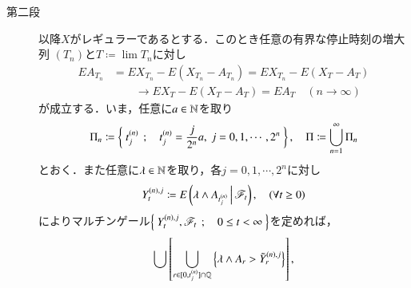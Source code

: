\begin{prf}
\begin{description}
			\item[第二段]
				以降$X$がレギュラーであるとする．このとき任意の有界な停止時刻の増大列
				$(T_n)$と$T \coloneqq \lim T_n$に対し
				\begin{align}
					EA_{T_n} &= EX_{T_n} - E(X_{T_n} - A_{T_n})
					= EX_{T_n} - E(X_T - A_T) \\
					&\qquad \longrightarrow EX_T - E(X_T - A_T)
					= EA_T
					\quad (n \longrightarrow \infty)
					\label{eq:chapter_1_theorem_4_14_1}
				\end{align}
				が成立する．いま，任意に$a \in \mathbb{N}$を取り
				\begin{align}
					\Pi_n \coloneqq 
					\Set{t^{(n)}_j}{t^{(n)}_j = \frac{j}{2^n}a,\ j=0,1,\cdots,2^n},
					\quad \Pi \coloneqq \bigcup_{n=1}^\infty \Pi_n
				\end{align}
				とおく．また任意に$\lambda \in \mathbb{N}$を取り，各$j = 0,1,\cdots,2^n$に対し
				\begin{align}
					Y^{(n),j}_t \coloneqq
					E\left( \lambda \wedge A_{t^{(n)}_j} \, \middle|\, \mathscr{F}_t \right),
					\quad (\forall t \geq 0)
				\end{align}
				によりマルチンゲール$\left\{\ Y^{(n),j}_t,\mathscr{F}_t\ \, ; \quad 0 \leq t < \infty\ \right\}$を定めれば，
				\begin{align}
					[0,\infty) \ni t \longmapsto EY^{(n),j}_t 
					= E\left(\lambda \wedge A_{t^{(n)}_j}\right)
				\end{align}
				と Theorem 3.13 より$RCLL$な修正$\tilde{Y}^{(n),j}$が存在する．このとき
				各$t \geq 0$で
				\begin{align}
					\int_A \tilde{Y}^{(n),j}_t\ dP 
					= \int_A \lambda \wedge A_{t^{(n)}_j}\ dP
					\leq \lambda P(A),
					\quad (\forall A \in \mathscr{F}_t)
				\end{align}
				となり，一方で各$0 \leq t \leq t^{(n)}_j$で
				\begin{align}
					\int_A \lambda \wedge A_t\ dP
					\leq \int_A \lambda \wedge A_{t^{(n)}_j}\ dP
					= \int_A \tilde{Y}^{(n),j}_t\ dP 
				\end{align}
				となるから
				\begin{align}
					E_j &\coloneqq \Set{\tilde{Y}^{(n),j}_t > \lambda}{\exists t \geq 0} 
						\cup \Set{\lambda \wedge A_t > \tilde{Y}^{(n),j}_t}{\exists t \in [0,t^{(n)}_j]} \\
					&= \left[ \bigcup_{r \in [0,\infty)\cap\Q}\left\{\tilde{Y}^{(n),j}_r > \lambda\right\} \right]
					\bigcup \left[ \bigcup_{r \in [0,t^{(n)}_j]\cap\Q}\left\{\lambda \wedge A_r > \tilde{Y}^{(n),j}_r\right\} \right], \\

\end{align}
\end{description}
\end{prf}
